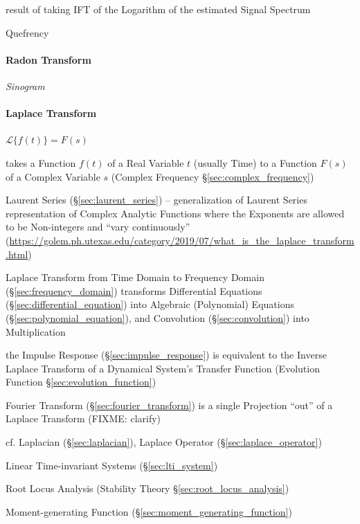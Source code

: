 {result of taking IFT of the Logarithm of the estimated Signal Spectrum

Quefrency



\paragraph{Radon Transform}\label{sec:radon_transform}\hfill

\emph{Sinogram}



\paragraph{Laplace Transform}\label{sec:laplace_transform}\hfill

$\mathcal{L}\{f(t)\} = F(s)$

takes a Function $f(t)$ of a Real Variable $t$ (usually Time) to a Function
$F(s)$ of a Complex Variable $s$ (Complex Frequency
\S\ref{sec:complex_frequency})

\fist Laurent Series (\S\ref{sec:laurent_series}) -- generalization of
Laurent Series representation of Complex Analytic Functions where the Exponents
are allowed to be Non-integers and ``vary continuously''
(\url{https://golem.ph.utexas.edu/category/2019/07/what_is_the_laplace_transform.html})

Laplace Transform from Time Domain to Frequency Domain
(\S\ref{sec:frequency_domain}) transforms Differential Equations
(\S\ref{sec:differential_equation}) into Algebraic (Polynomial) Equations
(\S\ref{sec:polynomial_equation}), and Convolution (\S\ref{sec:convolution})
into Multiplication

the Impulse Response (\S\ref{sec:impulse_response}) is equivalent to the Inverse
Laplace Transform of a Dynamical System's Transfer Function (Evolution Function
\S\ref{sec:evolution_function})

\fist Fourier Transform (\S\ref{sec:fourier_transform}) is a single Projection
``out'' of a Laplace Transform (FIXME: clarify)

\fist cf. Laplacian (\S\ref{sec:laplacian}), Laplace Operator
(\S\ref{sec:laplace_operator}) %

\fist Linear Time-invariant Systems (\S\ref{sec:lti_system})

\fist Root Locus Analysis (Stability Theory \S\ref{sec:root_locus_analysis})

\fist Moment-generating Function (\S\ref{sec:moment_generating_function})

}
